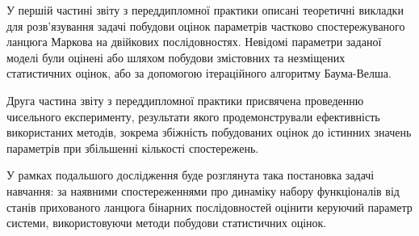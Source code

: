 У першій частині звіту з переддипломної практики описані теоретичні викладки для розв'язування задачі побудови оцінок параметрів частково спостережуваного ланцюга Маркова на двійкових послідовностях. Невідомі параметри заданої моделі були оцінені або шляхом побудови змістовних та незміщених статистичних оцінок, або за допомогою ітераційного алгоритму Баума-Велша.

Друга частина звіту з переддипломної практики присвячена проведенню чисельного експерименту, результати якого продемонстрували ефективність використаних методів, зокрема збіжність побудованих оцінок до істинних значень параметрів при збільшенні кількості спостережень.

У рамках подальшого дослідження буде розглянута така постановка задачі навчання: за наявними спостереженнями про динаміку набору функціоналів від станів прихованого ланцюга бінарних послідовностей оцінити керуючий параметр системи, використовуючи методи побудови статистичних оцінок.